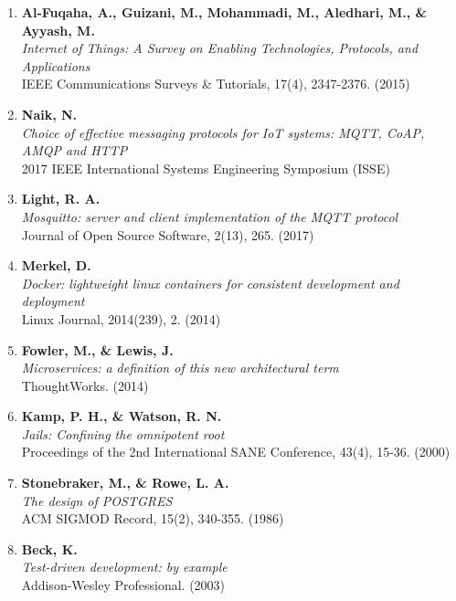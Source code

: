 \begin{enumerate}

    \item \textbf{Al-Fuqaha, A., Guizani, M., Mohammadi, M., Aledhari, M., \& Ayyash, M.} \\
    \textit{Internet of Things: A Survey on Enabling Technologies, Protocols, and Applications} \\
    IEEE Communications Surveys \& Tutorials, 17(4), 2347-2376. (2015)

    \item \textbf{Naik, N.} \\
    \textit{Choice of effective messaging protocols for IoT systems: MQTT, CoAP, AMQP and HTTP} \\
    2017 IEEE International Systems Engineering Symposium (ISSE)

    \item \textbf{Light, R. A.} \\
    \textit{Mosquitto: server and client implementation of the MQTT protocol} \\
    Journal of Open Source Software, 2(13), 265. (2017)

    \item \textbf{Merkel, D.} \\
    \textit{Docker: lightweight linux containers for consistent development and deployment} \\
    Linux Journal, 2014(239), 2. (2014)

    \item \textbf{Fowler, M., \& Lewis, J.} \\
    \textit{Microservices: a definition of this new architectural term} \\
    ThoughtWorks. (2014)

    \item \textbf{Kamp, P. H., \& Watson, R. N.} \\
    \textit{Jails: Confining the omnipotent root} \\
    Proceedings of the 2nd International SANE Conference, 43(4), 15-36. (2000)

    \item \textbf{Stonebraker, M., \& Rowe, L. A.} \\
    \textit{The design of POSTGRES} \\
    ACM SIGMOD Record, 15(2), 340-355. (1986)

    \item \textbf{Beck, K.} \\
    \textit{Test-driven development: by example} \\
    Addison-Wesley Professional. (2003)

\end{enumerate}

